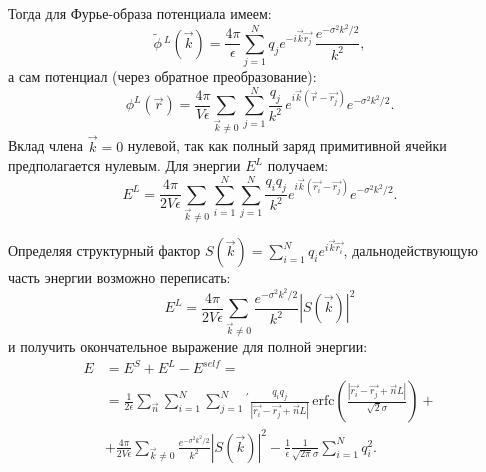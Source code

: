 Тогда для Фурье-образа потенциала имеем:
\begin{equation}
    \label{eq:jel:phi_L_fourier}
    \tilde{\phi}\,^L (\vec{k}) = \frac{4\pi}{\epsilon} \sum_{j=1}^N q_j e^{-i \vec{k} \vec{r_j}}\, \frac{ e^{-\sigma^2 k^2 / 2} }{ k^2 },
\end{equation}
а сам потенциал (через обратное преобразование):
\begin{equation}
    \label{eq:jel:phi_L_spatial}
    \phi^L (\vec{r}) = \frac{4\pi}{V \epsilon} \sum_{\vec{k} \neq 0} \sum_{j=1}^N \frac{q_j}{k^2}\, e^{i \vec{k} (\vec{r} - \vec{r_j})} e^{-\sigma^2 k^2 / 2}.
\end{equation}
Вклад члена $\vec{k} = 0$ нулевой, так как полный заряд примитивной ячейки предполагается нулевым.
Для энергии $E^L$ получаем:
\begin{equation}
    \label{eq:jel:E_L_final}
    E^L = \frac{4\pi}{2V \epsilon} \sum_{\vec{k} \neq 0} \sum_{i=1}^N \sum_{j=1}^N \frac{q_i q_j}{k^2} e^{i \vec{k} (\vec{r_i} - \vec{r_j})} e^{-\sigma^2 k^2 / 2}.
\end{equation}

Определяя структурный фактор $S (\vec{k}) = \sum_{i=1}^N q_i e^{i\vec{k} \vec{r_i}}$, дальнодействующую часть энергии возможно переписать:
\begin{equation}
    \label{eq:jel:E_L_from_S}
    E^L = \frac{4\pi}{2V \epsilon} \sum_{\vec{k} \neq 0} \frac{e^{-\sigma^2 k^2 /2}}{k^2} | S (\vec{k}) |^2
\end{equation}
и получить окончательное выражение для полной энергии:
\begin{equation}
\label{eq:jel:total_energy_final}
\begin{aligned}
    E &= E^S + E^L - E^{self} = \\
    &= \frac{1}{2 \epsilon} \sum_{\vec{n}} \sum_{i=1}^N \sum_{j=1}^N {}^\prime \frac{q_i q_j}{|\vec{r_i} - \vec{r_j} + \vec{n}L|}\, \mathrm{erfc} \left( \frac{ |\vec{r_i} - \vec{r_j} + \vec{n}L| }{ \sqrt{2} \sigma } \right) + \\
    &+ \frac{4\pi}{2V \epsilon} \sum_{\vec{k} \neq 0} \frac{e^{-\sigma^2 k^2 / 2}}{k^2} | S (\vec{k}) |^2 - \frac{1}{\epsilon} \frac{1}{\sqrt{2\pi} \sigma} \sum_{i=1}^N q_i^2.
\end{aligned}
\end{equation}

